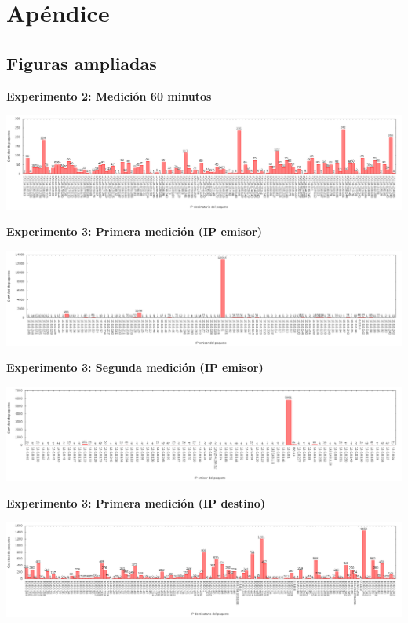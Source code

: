 \section{Apéndice}

\subsection{Figuras ampliadas}\label{ampliaciones}

\textbf{Experimento 2: Medición 60 minutos}
\begin{center}
  \includegraphics[angle=90, height=0.8\textheight]{../mediciones/altop-wifi-60/altop60IpsDstArp.png}
\end{center}

\newpage

\textbf{Experimento 3: Primera medición (IP emisor)} \label{exp3_1_src}
\begin{center}
  \includegraphics[angle=90, height=0.8\textheight]{../mediciones/job1/src.png}
\end{center}

\newpage

\textbf{Experimento 3: Segunda medición (IP emisor)} \label{exp3_2_src}
\begin{center}
  \includegraphics[angle=90, height=0.8\textheight]{../mediciones/job2/src.png}
\end{center}

\newpage

\textbf{Experimento 3: Primera medición (IP destino)} \label{exp3_1_dst}
\begin{center}
  \includegraphics[angle=90, height=0.8\textheight]{../mediciones/job1/dst.png}
\end{center}

